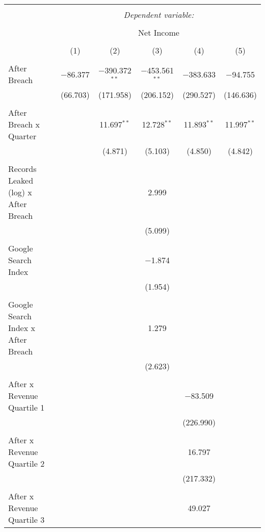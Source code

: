 
\begin{table}[!htbp] \centering 
  \caption{} 
  \label{} 
\begin{tabular}{@{\extracolsep{5pt}}lccccc} 
\\[-1.8ex]\hline 
\hline \\[-1.8ex] 
 & \multicolumn{5}{c}{\textit{Dependent variable:}} \\ 
\cline{2-6} 
\\[-1.8ex] & \multicolumn{5}{c}{Net Income} \\ 
\\[-1.8ex] & (1) & (2) & (3) & (4) & (5)\\ 
\hline \\[-1.8ex] 
 After Breach & $-$86.377 & $-$390.372$^{**}$ & $-$453.561$^{**}$ & $-$383.633 & $-$94.755 \\ 
  & (66.703) & (171.958) & (206.152) & (290.527) & (146.636) \\ 
  & & & & & \\ 
 After Breach x Quarter &  & 11.697$^{**}$ & 12.728$^{**}$ & 11.893$^{**}$ & 11.997$^{**}$ \\ 
  &  & (4.871) & (5.103) & (4.850) & (4.842) \\ 
  & & & & & \\ 
 Records Leaked (log) x After Breach &  &  & 2.999 &  &  \\ 
  &  &  & (5.099) &  &  \\ 
  & & & & & \\ 
 Google Search Index &  &  & $-$1.874 &  &  \\ 
  &  &  & (1.954) &  &  \\ 
  & & & & & \\ 
 Google Search Index x After Breach &  &  & 1.279 &  &  \\ 
  &  &  & (2.623) &  &  \\ 
  & & & & & \\ 
 After x Revenue Quartile 1 &  &  &  & $-$83.509 &  \\ 
  &  &  &  & (226.990) &  \\ 
  & & & & & \\ 
 After x Revenue Quartile 2 &  &  &  & 16.797 &  \\ 
  &  &  &  & (217.332) &  \\ 
  & & & & & \\ 
 After x Revenue Quartile 3 &  &  &  & 49.027 &  \\ 

\end{tabular}
\end{table}
